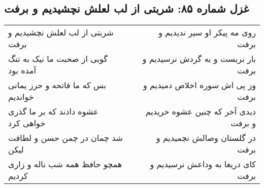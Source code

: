 \begin{center}
\section*{غزل شماره ۸۵: شربتی از لب لعلش نچشیدیم و برفت}
\label{sec:sh085}
\begin{longtable}{l p{0.5cm} r}
شربتی از لب لعلش نچشیدیم و برفت
&&
روی مه پیکر او سیر ندیدیم و برفت
\\
گویی از صحبت ما نیک به تنگ آمده بود
&&
بار بربست و به گردش نرسیدیم و برفت
\\
بس که ما فاتحه و حرز یمانی خواندیم
&&
وز پی اش سوره اخلاص دمیدیم و برفت
\\
عشوه دادند که بر ما گذری خواهی کرد
&&
دیدی آخر که چنین عشوه خریدیم و برفت
\\
شد چمان در چمن حسن و لطافت لیکن
&&
در گلستان وصالش نچمیدیم و برفت
\\
همچو حافظ همه شب ناله و زاری کردیم
&&
کای دریغا به وداعش نرسیدیم و برفت
\\
\end{longtable}
\end{center}

